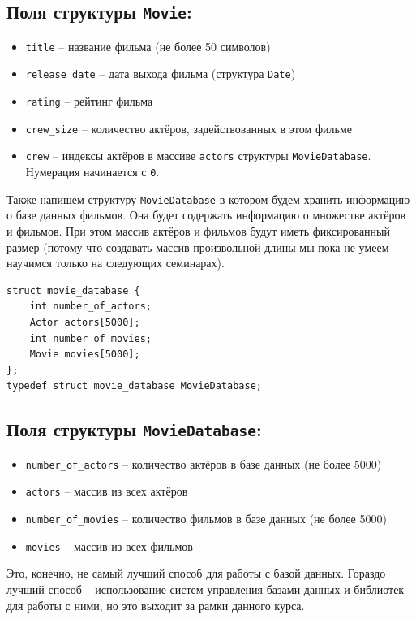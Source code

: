 \documentclass{article}
\begin{document}
\subsection*{Поля структуры \texttt{Movie}:}
\begin{itemize}
\item \texttt{title} -- название фильма (не более 50 символов)
\item \texttt{release\_date} -- дата выхода фильма (структура \texttt{Date})
\item \texttt{rating} -- рейтинг фильма
\item \texttt{crew\_size} -- количество актёров, задействованных в этом фильме
\item \texttt{crew} -- индексы актёров в массиве \texttt{actors} структуры \texttt{MovieDatabase}. Нумерация начинается с \texttt{0}.
\end{itemize}

Также напишем структуру \texttt{MovieDatabase} в котором будем хранить информацию о базе данных фильмов. Она будет содержать информацию о множестве актёров и фильмов. При этом массив актёров и фильмов будут иметь фиксированный размер (потому что создавать массив произвольной длины мы пока не умеем -- научимся только на следующих семинарах).
\begin{lstlisting}
struct movie_database {
    int number_of_actors;
    Actor actors[5000];
    int number_of_movies;
    Movie movies[5000]; 
};
typedef struct movie_database MovieDatabase;
\end{lstlisting}

\subsection*{Поля структуры \texttt{MovieDatabase}:}
\begin{itemize}
\item \texttt{number\_of\_actors} -- количество актёров в базе данных (не более 5000)
\item \texttt{actors} -- массив из всех актёров
\item \texttt{number\_of\_movies} -- количество фильмов в базе данных (не более 5000)
\item \texttt{movies} -- массив из всех фильмов
\end{itemize}

Это, конечно, не самый лучший способ для работы с базой данных. Гораздо лучший способ -- использование систем управления базами данных и библиотек для работы с ними, но это выходит за рамки данного курса.
\end{document}
